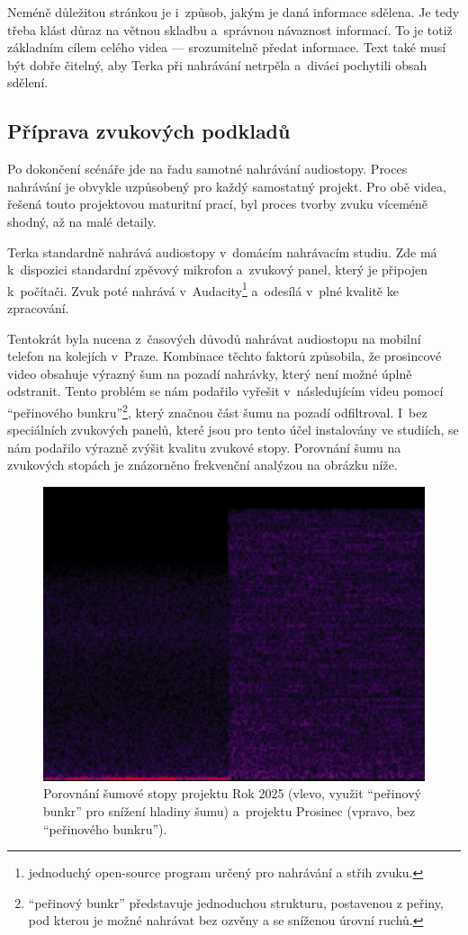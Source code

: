 \documentclass[12pt,a4paper,titlepage]{article}
\begin{document}
Neméně důležitou stránkou je i~způsob, jakým je daná informace sdělena. Je tedy třeba klást důraz na větnou skladbu a~správnou návaznost informací. To je totiž základním cílem celého videa --- srozumitelně předat informace. Text také musí být dobře čitelný, aby Terka při nahrávání netrpěla a~diváci pochytili obsah sdělení.

\subsection{Příprava zvukových podkladů}\label{makingof:audio-prep}
Po dokončení scénáře jde na řadu samotné nahrávání audiostopy. Proces nahrávání je obvykle uzpůsobený pro každý samostatný projekt. Pro obě videa, řešená touto projektovou maturitní prací, byl proces tvorby zvuku víceméně shodný, až na malé detaily. 

Terka standardně nahrává audiostopy v~domácím nahrávacím studiu. Zde má k~dispozici standardní zpěvový mikrofon a~zvukový panel, který je připojen k~počítači. Zvuk poté nahrává v~Audacity\footnote{jednoduchý open-source program určený pro nahrávání a střih zvuku.} a~odesílá v~plné kvalitě ke zpracování. 

Tentokrát byla nucena z~časových důvodů nahrávat audiostopu na mobilní telefon na kolejích v~Praze. Kombinace těchto faktorů způsobila, že prosincové video obsahuje výrazný šum na pozadí nahrávky, který není možné úplně odstranit. Tento problém se nám podařilo vyřešit v~následujícím videu pomocí \enquote{peřinového bunkru}\footnote{\enquote{peřinový bunkr} představuje jednoduchou strukturu, postavenou z peřiny, pod kterou je možné nahrávat bez ozvěny a se sníženou úrovní ruchů.}, který značnou část šumu na pozadí odfiltroval. I~bez speciálních zvukových panelů, které jsou pro tento účel instalovány ve studiích, se nám podařilo výrazně zvýšit kvalitu zvukové stopy. Porovnání šumu na zvukových stopách je znázorněno frekvenční analýzou na obrázku níže.
\begin{figure}[H]
	\centering
	\includegraphics[width=.8\textwidth]{fourier.png}
	\caption{Porovnání šumové stopy projektu Rok 2025 (vlevo, využit \enquote{peřinový bunkr} pro snížení hladiny šumu) a~projektu Prosinec (vpravo, bez \enquote{peřinového bunkru}).}\label{img:fourier}
\end{figure}
\end{document}
